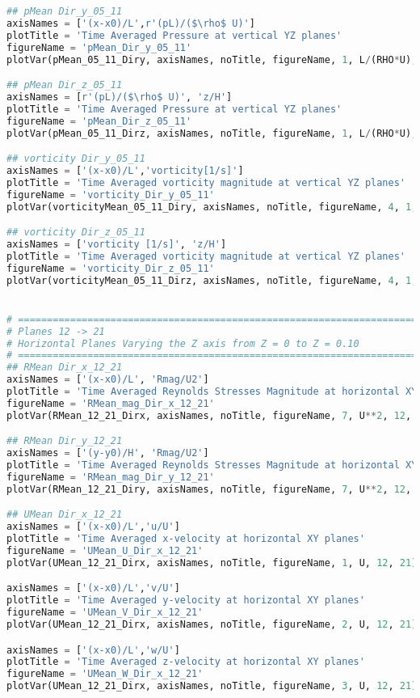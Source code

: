 \begin{lstlisting}[language=python]
## pMean Dir_y_05_11
axisNames = ['(x-x0)/L',r'(pL)/($\rho$ U)']
plotTitle = 'Time Averaged Pressure at vertical YZ planes'
figureName = 'pMean_Dir_y_05_11'
plotVar(pMean_05_11_Diry, axisNames, noTitle, figureName, 1, L/(RHO*U), 5, 11)

## pMean Dir_z_05_11
axisNames = [r'(pL)/($\rho$ U)', 'z/H']
plotTitle = 'Time Averaged Pressure at vertical YZ planes'
figureName = 'pMean_Dir_z_05_11'
plotVar(pMean_05_11_Dirz, axisNames, noTitle, figureName, 1, L/(RHO*U), 5, 11)

## vorticity Dir_y_05_11
axisNames = ['(x-x0)/L','vorticity[1/s]']
plotTitle = 'Time Averaged vorticity magnitude at vertical YZ planes'
figureName = 'vorticity_Dir_y_05_11'
plotVar(vorticityMean_05_11_Diry, axisNames, noTitle, figureName, 4, 1, 5, 11)

## vorticity Dir_z_05_11
axisNames = ['vorticity [1/s]', 'z/H']
plotTitle = 'Time Averaged vorticity magnitude at vertical YZ planes'
figureName = 'vorticity_Dir_z_05_11'
plotVar(vorticityMean_05_11_Dirz, axisNames, noTitle, figureName, 4, 1, 5, 11)


# =============================================================================
# Planes 12 -> 21
# Horizontal Planes Varying the Z axis from Z = 0 to Z = 0.10
# =============================================================================
## RMean Dir_x_12_21
axisNames = ['(x-x0)/L', 'Rmag/U2']
plotTitle = 'Time Averaged Reynolds Stresses Magnitude at horizontal XY planes'
figureName = 'RMean_mag_Dir_x_12_21'
plotVar(RMean_12_21_Dirx, axisNames, noTitle, figureName, 7, U**2, 12, 21)

## RMean Dir_y_12_21
axisNames = ['(y-y0)/H', 'Rmag/U2']
plotTitle = 'Time Averaged Reynolds Stresses Magnitude at horizontal XY planes'
figureName = 'RMean_mag_Dir_y_12_21'
plotVar(RMean_12_21_Diry, axisNames, noTitle, figureName, 7, U**2, 12, 21)

## UMean Dir_x_12_21
axisNames = ['(x-x0)/L','u/U']
plotTitle = 'Time Averaged x-velocity at horizontal XY planes'
figureName = 'UMean_U_Dir_x_12_21'
plotVar(UMean_12_21_Dirx, axisNames, noTitle, figureName, 1, U, 12, 21)

axisNames = ['(x-x0)/L','v/U']
plotTitle = 'Time Averaged y-velocity at horizontal XY planes'
figureName = 'UMean_V_Dir_x_12_21'
plotVar(UMean_12_21_Dirx, axisNames, noTitle, figureName, 2, U, 12, 21)

axisNames = ['(x-x0)/L','w/U']
plotTitle = 'Time Averaged z-velocity at horizontal XY planes'
figureName = 'UMean_W_Dir_x_12_21'
plotVar(UMean_12_21_Dirx, axisNames, noTitle, figureName, 3, U, 12, 21)


\end{lstlisting}
